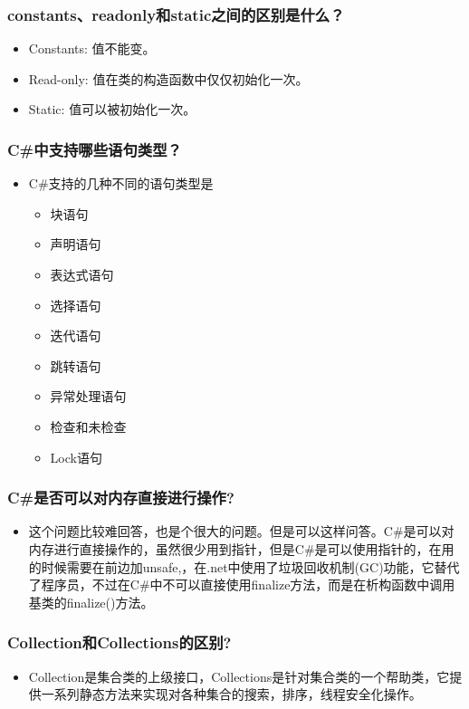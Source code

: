 \documentclass[9pt, b5paper]{article}
\begin{document}
\subsubsection{constants、readonly和static之间的区别是什么？}
\label{sec-1-2-74}
\begin{itemize}
\item Constants: 值不能变。
\item Read-only: 值在类的构造函数中仅仅初始化一次。
\item Static: 值可以被初始化一次。
\end{itemize}
\subsubsection{C\#中支持哪些语句类型？}
\label{sec-1-2-75}
\begin{itemize}
\item C\#支持的几种不同的语句类型是
\begin{itemize}
\item 块语句
\item 声明语句
\item 表达式语句
\item 选择语句
\item 迭代语句
\item 跳转语句
\item 异常处理语句
\item 检查和未检查
\item Lock语句
\end{itemize}
\end{itemize}
\subsubsection{C\#是否可以对内存直接进行操作?}
\label{sec-1-2-76}
\begin{itemize}
\item 这个问题比较难回答，也是个很大的问题。但是可以这样问答。C\#是可以对内存进行直接操作的，虽然很少用到指针，但是C\#是可以使用指针的，在用的时候需要在前边加unsafe,，在.net中使用了垃圾回收机制(GC)功能，它替代了程序员，不过在C\#中不可以直接使用finalize方法，而是在析构函数中调用基类的finalize()方法。
\end{itemize}
\subsubsection{Collection和Collections的区别?}
\label{sec-1-2-77}
\begin{itemize}
\item Collection是集合类的上级接口，Collections是针对集合类的一个帮助类，它提供一系列静态方法来实现对各种集合的搜索，排序，线程安全化操作。
\end{itemize}
\end{document}

